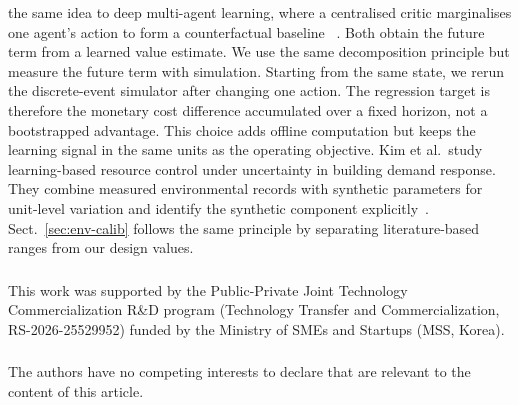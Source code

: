 \documentclass{llncs}
\begin{document}
the same idea to deep multi-agent learning, where a centralised critic
marginalises one agent's action to form a counterfactual baseline
~\cite{ref11}. Both obtain the future term from a learned value estimate.
We use the same decomposition principle but measure the future term with
simulation. Starting from the same state, we rerun the discrete-event
simulator after changing one action. The regression target is therefore
the monetary cost difference accumulated over a fixed horizon, not a
bootstrapped advantage. This choice adds offline computation but keeps
the learning signal in the same units as the operating objective.
Kim et al.\ study learning-based resource control under uncertainty in
building demand response. They combine measured environmental records
with synthetic parameters for unit-level variation and identify the
synthetic component explicitly~\cite{ref20}. Sect.~\ref{sec:env-calib}
follows the same principle by separating literature-based ranges from
our design values.







\begin{credits}
\subsubsection{\ackname}
This work was supported by the Public-Private Joint Technology
Commercialization R\&D program (Technology Transfer and
Commercialization, RS-2026-25529952) funded by the Ministry of SMEs and
Startups (MSS, Korea).

\subsubsection{\discintname}
The authors have no competing interests to declare that are relevant to
the content of this article.
\end{credits}
\end{document}
